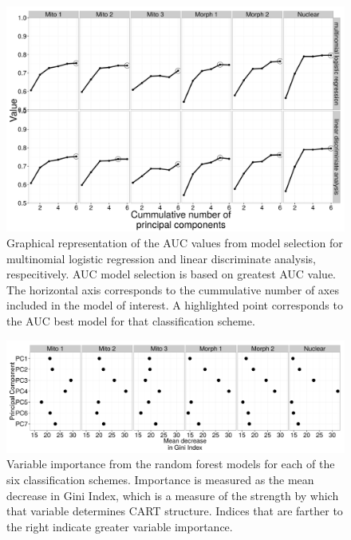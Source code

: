 \documentclass[12pt,letterpaper]{article}
\begin{document}
\begin{figure}[ht]
  \centering
  \includegraphics[height = \textheight, width = \textwidth, keepaspectratio = true]{figure/sel_val}
  \caption{Graphical representation of the AUC values from model selection for multinomial logistic regression and linear discriminate analysis, respecitively. AUC model selection is based on greatest AUC value. The horizontal axis corresponds to the cummulative number of axes included in the model of interest. A highlighted point corresponds to the AUC best model for that classification scheme.}
  \label{fig:sel}
\end{figure}

\begin{figure}[ht]
  \centering
  \includegraphics[height = \textheight, width = \textwidth, keepaspectratio = true]{figure/var_imp}
  \caption{Variable importance from the random forest models for each of the six classification schemes. Importance is measured as the mean decrease in Gini Index, which is a measure of the strength by which that variable determines CART structure. Indices that are farther to the right indicate greater variable importance.}
  \label{fig:var_imp}
\end{figure}
\end{document}
